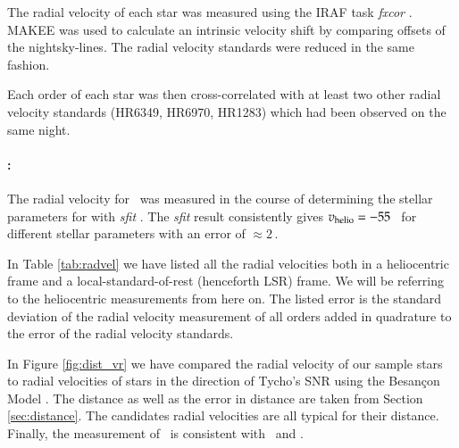The radial velocity of each star was measured using the IRAF task \textit{fxcor} \citep{1979AJ.....84.1511T}. MAKEE was used to calculate an intrinsic velocity shift by comparing offsets of the nightsky-lines. The radial velocity standards were reduced in the same fashion. 
 
Each order of each star was then cross-correlated with at least two other radial velocity standards (HR6349, HR6970, HR1283) which had been observed on the same night.


\paragraph{\starb:}
The radial velocity for \starb\ was measured in the course of determining the stellar parameters for \starb with \textit{sfit} \citesfit. The \textit{sfit} result consistently gives $v_{\textnormal{helio}} = -55$ \kms\ for different stellar parameters with an error of $\approx 2$\,\kms. 


In Table \ref{tab:radvel} we have listed all the radial velocities both in a heliocentric frame and a local-standard-of-rest (henceforth LSR) frame. We will be referring to the heliocentric measurements from here on. The listed error is the standard deviation of the radial velocity measurement of all orders added in quadrature to the error of the radial velocity standards.

In Figure \ref{fig:dist_vr} we have compared the radial velocity of our sample stars to radial velocities of stars in the direction of Tycho's SNR using the Besan\c{c}on Model \citep{2003A&A...409..523R}. The distance as well as the error in distance are taken from Section \ref{sec:distance}.  The candidates radial velocities are all typical for their distance. Finally, the measurement of \starg\ is consistent with \wek\ and \gh.

%



